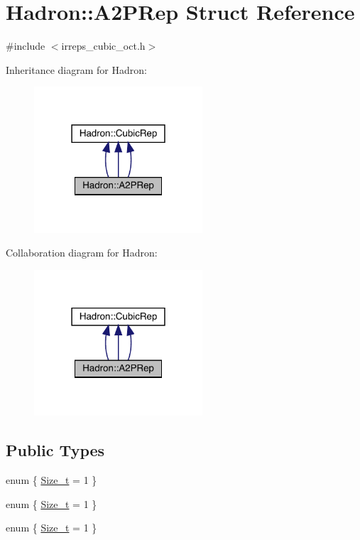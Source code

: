 \hypertarget{structHadron_1_1A2PRep}{}\section{Hadron\+:\+:A2\+P\+Rep Struct Reference}
\label{structHadron_1_1A2PRep}


{\ttfamily \#include $<$irreps\+\_\+cubic\+\_\+oct.\+h$>$}



Inheritance diagram for Hadron\+:
\nopagebreak
\begin{figure}[H]
\begin{center}
\leavevmode
\includegraphics[width=178pt]{d2/dae/structHadron_1_1A2PRep__inherit__graph}
\end{center}
\end{figure}


Collaboration diagram for Hadron\+:
\nopagebreak
\begin{figure}[H]
\begin{center}
\leavevmode
\includegraphics[width=178pt]{dd/dcf/structHadron_1_1A2PRep__coll__graph}
\end{center}
\end{figure}
\subsection*{Public Types}
\begin{DoxyCompactItemize}
\item 
enum \{ \mbox{\hyperlink{structHadron_1_1A2PRep_affd9574b90864a13b6b3bc93be4f78f0ae1efe7e97645fe0900f05f96b945d3f6}{Size\+\_\+t}} = 1
 \}
\item 
enum \{ \mbox{\hyperlink{structHadron_1_1A2PRep_affd9574b90864a13b6b3bc93be4f78f0ae1efe7e97645fe0900f05f96b945d3f6}{Size\+\_\+t}} = 1
 \}
\item 
enum \{ \mbox{\hyperlink{structHadron_1_1A2PRep_affd9574b90864a13b6b3bc93be4f78f0ae1efe7e97645fe0900f05f96b945d3f6}{Size\+\_\+t}} = 1
 \}
\end{DoxyCompactItemize}
